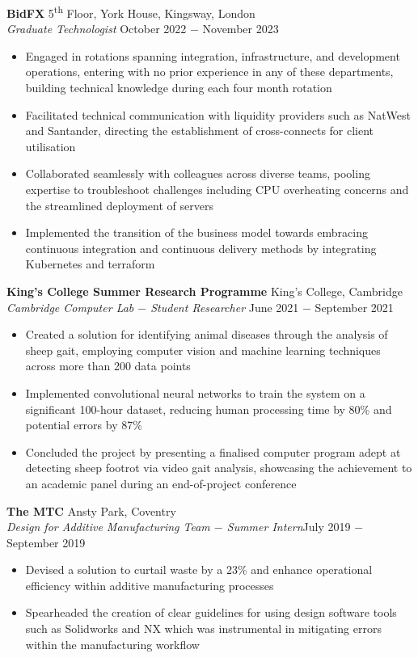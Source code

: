 \documentclass{article}
\begin{document}
\textbf{BidFX} \hfill 5\textsuperscript{th} Floor, York House, Kingsway, London\\
\textit{Graduate Technologist} \hfill October 2022 $-$ November 2023
\begin{itemize}
    \item Engaged in rotations spanning integration, infrastructure, and development operations, entering with no prior experience in any of these departments, building technical knowledge during each four month rotation
    \item Facilitated technical communication with liquidity providers such as NatWest and Santander, directing the establishment of cross-connects for client utilisation
    \item Collaborated seamlessly with colleagues across diverse teams, pooling expertise to troubleshoot challenges including CPU overheating concerns and the streamlined deployment of servers 
    \item Implemented the transition of the business model towards embracing continuous integration and continuous delivery methods by integrating Kubernetes and terraform
\end{itemize} \medskip

\textbf{King's College Summer Research Programme} \hfill King's College, Cambridge \\
\textit{Cambridge Computer Lab $-$ Student Researcher} \hfill June 2021 $-$ September 2021
\begin{itemize}
    \item Created a solution for identifying animal diseases through the analysis of sheep gait, employing computer vision and machine learning techniques across more than 200 data points
    \item Implemented convolutional neural networks to train the system on a significant 100-hour dataset, reducing human processing time by 80\% and potential errors by 87\%
    \item Concluded the project by presenting a finalised computer program adept at detecting sheep footrot via video gait analysis, showcasing the achievement to an academic panel during an end-of-project conference%
\end{itemize} \medskip

\textbf{The MTC} \hfill Ansty Park, Coventry \\
\textit{Design for Additive Manufacturing Team $-$ Summer Intern}\hfill July 2019 $-$ September 2019
\begin{itemize}
    \item Devised a solution to curtail waste by a 23\% and enhance operational efficiency within additive manufacturing processes
    \item Spearheaded the creation of clear guidelines for using design software tools such as Solidworks and NX which was instrumental in mitigating errors within the manufacturing workflow
\end{itemize} \medskip
\end{document}
